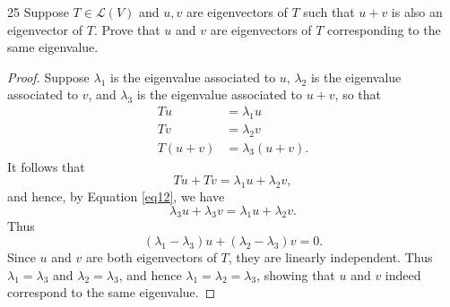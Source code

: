 \documentclass[11pt]{extarticle}
\newenvironment{problem}[1]{\begin{prob*}{#1}{}}{\end{prob*}}
\newcommand{\Hom}{\mathcal{L}}
\begin{document}
\begin{problem}{25}
Suppose $T\in\Hom(V)$ and $u,v$ are eigenvectors of $T$ such that $u+v$ is also an eigenvector of $T$.  Prove that $u$ and $v$ are eigenvectors of $T$ corresponding to the same eigenvalue.
\end{problem}
\begin{proof}
Suppose $\lambda_1$ is the eigenvalue associated to $u$, $\lambda_2$ is the eigenvalue associated to $v$, and $\lambda_3$ is the eigenvalue associated to $u+v$, so that
\begin{align}
Tu &= \lambda_1 u \label{eq10}\\
Tv &= \lambda_2 v \label{eq11}\\
T(u+v) &= \lambda_3(u+v). \label{eq12}
\end{align}
It follows that
\begin{equation*}
Tu + Tv = \lambda_1 u + \lambda_2 v,
\end{equation*}
and hence, by Equation \ref{eq12}, we have
\begin{equation*}
\lambda_3 u + \lambda_3 v = \lambda_1 u + \lambda_2 v.
\end{equation*}
Thus 
\begin{equation*}
(\lambda_1 - \lambda_3)u + (\lambda_2 - \lambda_3)v = 0.
\end{equation*}
Since $u$ and $v$ are both eigenvectors of $T$, they are linearly independent.  Thus $\lambda_1 = \lambda_3$ and $\lambda_2 = \lambda_3$, and hence $\lambda_1 = \lambda_2 = \lambda_3$, showing that $u$ and $v$ indeed correspond to the same eigenvalue.
\end{proof}
\end{document}
